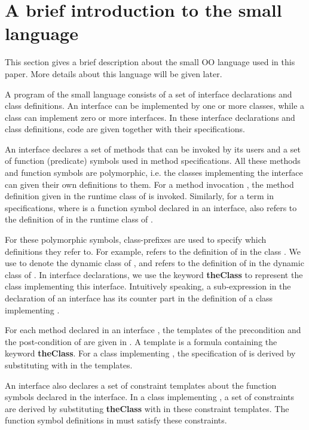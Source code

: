 \documentclass[fleqn]{llncs}
\begin{document}
\section{A brief introduction to the small language}\label{SEC-BRIEF-INTRODUCTION-LANGUAGE}
This section gives a brief description about the small OO language used in this paper. More details about this language will be given later.

A program of the small language consists of a set of interface declarations and class definitions.
An interface can be implemented by one or more classes, while a class can implement zero or more interfaces.
In these interface declarations and class definitions, code are given together with their specifications.

An interface declares a set of methods that can be invoked by its users and a set of function (predicate) symbols used in method specifications.
All these methods and function symbols are polymorphic, i.e. the classes implementing the interface can given their own definitions to them.
For a method invocation , the method definition given in the runtime class of  is invoked. Similarly, for a term  in specifications,
where  is a function symbol declared in an interface,  also refers to the definition of  in the runtime class of .

For these polymorphic symbols, class-prefixes are used to specify which definitions they refer to. For example,  refers to
the definition of  in the class . We use  to denote the dynamic class of , and  refers to the
definition of  in the dynamic class of .
In interface declarations, we use the keyword \textbf{theClass} to represent the class implementing this interface. Intuitively speaking,
a sub-expression  in the declaration of an interface  has its counter
part  in the definition of a class  implementing .

For each method  declared in an interface , the templates of the precondition and the post-condition of  are given in .
A template is a formula containing the keyword \textbf{theClass}. For a class  implementing , the specification of  is derived
by substituting   with  in the templates.

An interface also declares a set of constraint templates about the function symbols declared in the interface.
In a class  implementing , a set of constraints are derived by substituting \textbf{theClass} with  in these constraint templates.
The function symbol definitions in  must satisfy these constraints.
\end{document}
